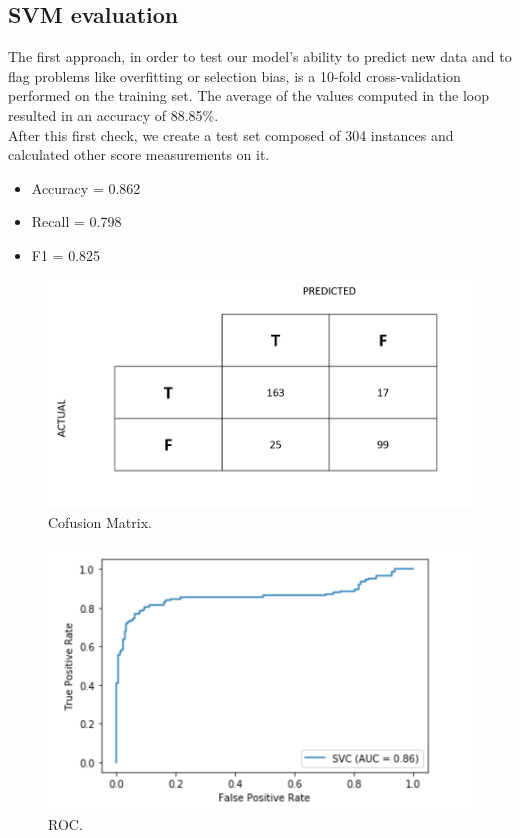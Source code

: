 \documentclass[conference]{IEEEtran}
\begin{document}
\subsection{SVM evaluation}
The first approach, in order to test our model's ability to predict new data and to flag problems like overfitting or selection bias, is a 10-fold cross-validation performed on the training set.
The average of the values computed in the loop resulted in an accuracy of 88.85\%.\\
After this first check, we create a test set composed of 304 instances and calculated other score measurements on it.\\
\begin{itemize}
   \item  Accuracy = 0.862
\end{itemize}
\begin{itemize}
   \item  Recall = 0.798
\end{itemize}
\begin{itemize}
   \item  F1 = 0.825
\end{itemize}
\bigskip


\begin{figure}[htbp]
  \centering
  \includegraphics[width=0.8\columnwidth]{../svm_curves/confusion_matrix.png}
  \caption{Cofusion Matrix.}
  \label{fig:Cofusion Matrix}
\end{figure}

\bigskip


\begin{figure}[htbp]
  \centering
  \includegraphics[width=0.8\columnwidth]{../svm_curves/ROC_curve.png}
  \caption{ROC.}
  \label{fig:ROC_curve}
\end{figure}
\end{document}

